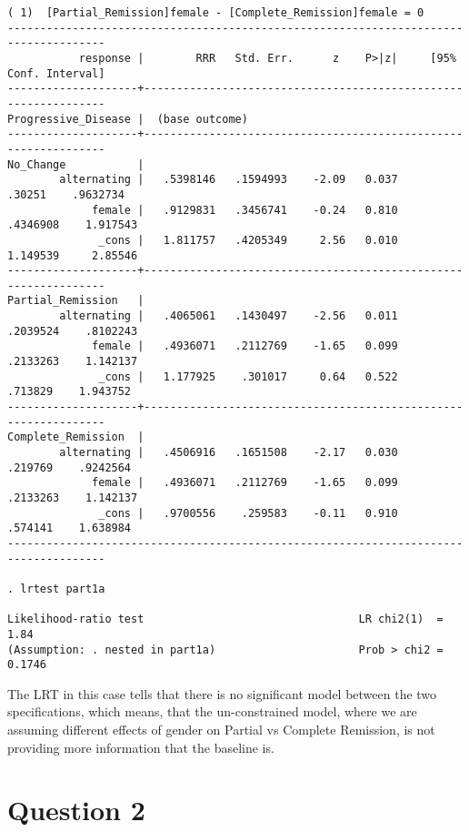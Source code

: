 \documentclass{article}
\begin{document}
\begin{enumerate}[a.]
\begin{enumerate}[i.]
\begin{verbatim}
( 1)  [Partial_Remission]female - [Complete_Remission]female = 0
-------------------------------------------------------------------------------------
           response |        RRR   Std. Err.      z    P>|z|     [95% Conf. Interval]
--------------------+----------------------------------------------------------------
Progressive_Disease |  (base outcome)
--------------------+----------------------------------------------------------------
No_Change           |
        alternating |   .5398146   .1594993    -2.09   0.037       .30251    .9632734
             female |   .9129831   .3456741    -0.24   0.810     .4346908    1.917543
              _cons |   1.811757   .4205349     2.56   0.010     1.149539     2.85546
--------------------+----------------------------------------------------------------
Partial_Remission   |
        alternating |   .4065061   .1430497    -2.56   0.011     .2039524    .8102243
             female |   .4936071   .2112769    -1.65   0.099     .2133263    1.142137
              _cons |   1.177925    .301017     0.64   0.522      .713829    1.943752
--------------------+----------------------------------------------------------------
Complete_Remission  |
        alternating |   .4506916   .1651508    -2.17   0.030      .219769    .9242564
             female |   .4936071   .2112769    -1.65   0.099     .2133263    1.142137
              _cons |   .9700556    .259583    -0.11   0.910      .574141    1.638984
-------------------------------------------------------------------------------------

. lrtest part1a

Likelihood-ratio test                                 LR chi2(1)  =      1.84
(Assumption: . nested in part1a)                      Prob > chi2 =    0.1746
\end{verbatim}

The LRT in this case tells that there is no significant model between the two specifications, which means, that the un-constrained model, where we are assuming different effects of gender on Partial vs Complete Remission, is not providing more information that the baseline is.
	
\end{enumerate}


\end{enumerate}

\section{Question 2}
\end{document}
